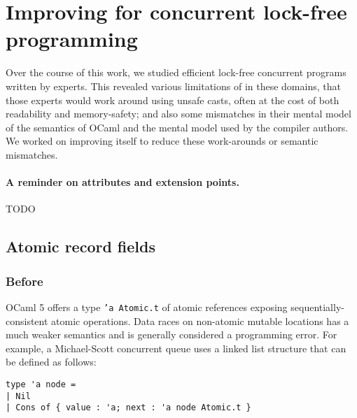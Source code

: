 \section{Improving \OCaml for concurrent lock-free programming}
\label{sec:ocaml}

\newcommand{\deanonlink}[1]{\footnote{\url{#1}. Warning: this link is not anonymized.}}

Over the course of this work, we studied efficient lock-free concurrent \OCaml programs written by experts. This revealed various limitations of \OCaml in these domains, that those experts would work around using unsafe casts, often at the cost of both readability and memory-safety; and also some mismatches in their mental model of the semantics of OCaml and the mental model used by the \OCaml compiler authors. We worked on improving \OCaml itself to reduce these work-arounds or semantic mismatches.

\paragraph{A reminder on \OCaml attributes and extension points.}

TODO

\subsection{Atomic record fields}

\subsubsection{Before}

OCaml 5 offers a type \texttt{'a Atomic.t} of atomic references exposing sequentially-consistent atomic operations. Data races on non-atomic mutable locations has a much weaker semantics and is generally considered a programming error. For example, a Michael-Scott concurrent queue uses a linked list structure that can be defined as follows:

\begin{verbatim}
type 'a node =
| Nil
| Cons of { value : 'a; next : 'a node Atomic.t }
\end{verbatim}

